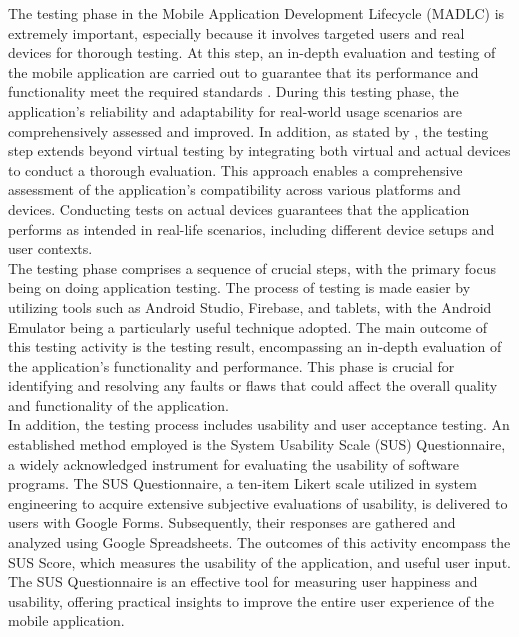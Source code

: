 The testing phase in the Mobile Application Development Lifecycle (MADLC) is extremely important, especially because it involves targeted users and real devices for thorough testing. At this step, an in-depth evaluation and testing of the mobile application are carried out to guarantee that its performance and functionality meet the required standards \parencite{shanmugam19}. During this testing phase, the application's reliability and adaptability for real-world usage scenarios are comprehensively assessed and improved. In addition, as stated by \textcite{wambua23}, the testing step extends beyond virtual testing by integrating both virtual and actual devices to conduct a thorough evaluation. This approach enables a comprehensive assessment of the application's compatibility across various platforms and devices. Conducting tests on actual devices guarantees that the application performs as intended in real-life scenarios, including different device setups and user contexts. \\

The testing phase comprises a sequence of crucial steps, with the primary focus being on doing application testing. The process of testing is made easier by utilizing tools such as Android Studio, Firebase, and tablets, with the Android Emulator being a particularly useful technique adopted. The main outcome of this testing activity is the testing result, encompassing an in-depth evaluation of the application's functionality and performance. This phase is crucial for identifying and resolving any faults or flaws that could affect the overall quality and functionality of the application. \\

In addition, the testing process includes usability and user acceptance testing. An established method employed is the System Usability Scale (SUS) Questionnaire, a widely acknowledged instrument for evaluating the usability of software programs. The SUS Questionnaire, a ten-item Likert scale utilized in system engineering to acquire extensive subjective evaluations of usability, is delivered to users with Google Forms. Subsequently, their responses are gathered and analyzed using Google Spreadsheets. The outcomes of this activity encompass the SUS Score, which measures the usability of the application, and useful user input. The SUS Questionnaire is an effective tool for measuring user happiness and usability, offering practical insights to improve the entire user experience of the mobile application. \\

